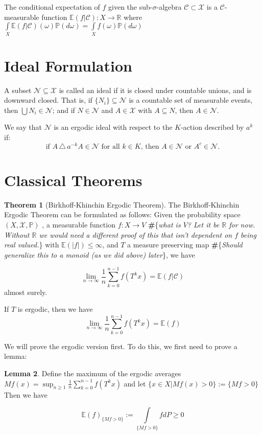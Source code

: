 \documentclass[letterpaper,10pt,oneside,onecolumn,reqno]{amsart}
\newcommand{\C}{\mathcal C}
\newcommand{\E}{\mathbb E}
\newcommand{\N}{\mathcal N}
\renewcommand{\P}{\mathbb P}
\newcommand{\R}{\mathbb R}
\newcommand{\X}{\mathcal X}
\theoremstyle{definition}
\newtheorem{thm}{Theorem}
\newtheorem{lem}[thm]{Lemma}
\newcommand{\jake}[1]{{\textbf{\color{Purple}\#}{\color{Purple}\{\emph{#1}\}}}}
\begin{document}
The conditional expectation of $f$ given the sub-$\sigma$-algebra $\C \subset \X$ is a $\C$-measurable function $\E(f|\C): X \to \R$ where $\int\limits_{X}\E(f|\C)(\omega)\P(d\omega)=\int\limits_{X}f(\omega)\P(d\omega)$ 

	\section{Ideal Formulation}

	A subset $\N \subseteq \X$ is called an ideal if it is closed under countable unions, and is downward closed. That is, if $\{ N_i \} \subseteq \N$ is a countable set of measurable events, then $\bigcup N_i \in \N$; and if $N \in \N$ and $A \in \X$ with $A \subseteq N$, then $A \in \N$.

	We say that $\N$ is an ergodic ideal with respect to the $K$-action described by $a^k$ if:
		$$\mbox{if $A \,\triangle\, a^{-k} A \in \N$ for all $k \in K$, then $A \in \N$ or $A^c \in \N$.}$$

\section{Classical Theorems}
	
		\begin{thm}[Birkhoff-Khinchin Ergodic Theorem]
			The Birkhoff-Khinchin Ergodic Theorem can be formulated as follows: Given the probability space $(X,\X, \P)$ , a measurable function $f : X \to V$ \jake{what is $V$? Let it be $\R$ for now. Without $\R$ we would need a different proof of this that isn't dependent on $f$ being real valued.} with $\E(|f|) \leq \infty$, and $T$ a measure preserving map \jake{Should generalize this to a monoid (as we did above) later}, we have  

$$\mbox{$\lim_{n \to \infty}\frac{1}{n}\sum\limits_{k=0}^{n-1} f(T^kx) = \E(f | \C)$}$$ 
almost surely. 

If $T$ is ergodic, then we have
$$\mbox{$\lim_{n \to \infty}\frac{1}{n}\sum\limits_{k=0}^{n-1} f(T^kx) = \E(f)$}$$
		\end{thm}
We will prove the ergodic version first. To do this, we first need to prove a lemma:

\begin{lem}
Define the maximum of the ergodic averages $Mf(x) = \sup_{n \geq 1} \frac{1}{n}\sum\limits_{k=0}^{n-1} f(T^k x)$ and let $\{x \in X | Mf(x) > 0\} := {\{Mf>0\}}$ Then we have

$$\mbox{$\E(f)_{\{Mf>0\}} := \int\limits_{\{Mf>0\}} fdP \geq 0$}$$
\end{lem}
\end{document}
